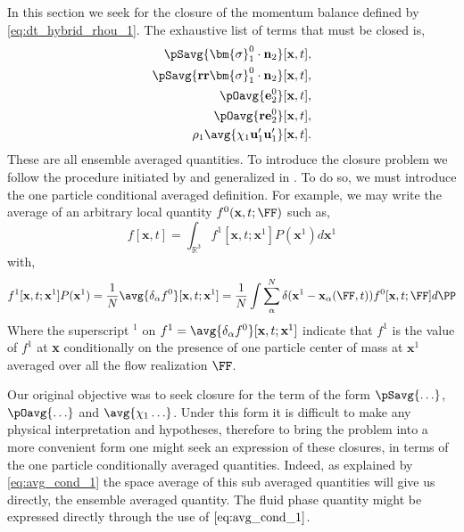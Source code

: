 In this section we seek for the closure of the momentum balance defined by \ref{eq:dt_hybrid_rhou_1}.
The exhaustive list of terms that must be closed is, 
\begin{align}
    \pSavg{\bm{\sigma}_1^0\cdot \textbf{n}_2}[\textbf{x},t],\\
    \pSavg{\textbf{rr}\bm{\sigma}_1^0\cdot \textbf{n}_2}[\textbf{x},t],\\
    \pOavg{\textbf{e}_2^0}[\textbf{x},t],\\
    \pOavg{\textbf{re}_2^0}[\textbf{x},t],\\
    \rho_1 \avg{\chi_1 \textbf{u}_1'\textbf{u}_1'}[\textbf{x},t].
    \label{eq:closures}
\end{align}
These are all ensemble averaged quantities. 
To introduce the closure problem we follow the procedure initiated by \citet{hinch1977averaged} and generalized in \citet[Appendix A]{zhang1994ensemble}. 
To do so, we must introduce the one particle conditional averaged definition. 
For example, we may write the average of an arbitrary local quantity $f^0(\textbf{x},t;\FF)$ such as, 
\begin{equation}
    f[\textbf{x},t]
    = \int_{\mathbb{R}^3}
    f^1[\textbf{x},t;\textbf{x}^1]
    P(\textbf{x}^1) d\textbf{x}^1
    \label{eq:avg_cond_1}
\end{equation}
with, 
\begin{equation*}
    f^1[\textbf{x},t;\textbf{x}^1] P(\textbf{x}^1)
    =
    \frac{1}{N} 
    \avg{\delta_\alpha f^0}[\textbf{x},t;\textbf{x}^1]
    = 
    \frac{1}{N}
    \int 
    \sum_\alpha^N \delta(\textbf{x}^1 - \textbf{x}_\alpha(\FF,t))
    f^0[\textbf{x},t;\FF]
    d\PP
\end{equation*}
Where the superscript $^1$ on $f^1 = \avg{\delta_\alpha f^0}[\textbf{x},t;\textbf{x}^1]$ indicate that $f^1$ is the value of $f^1$ at \textbf{x} conditionally on the presence of one particle center of mass at $\textbf{x}^1$ averaged over all the flow realization $\FF$. 

Our original objective was to seek closure for the term of the form $\pSavg{\ldots}$, $\pOavg{\ldots}$ and $\avg{\chi_1 \ldots}$.
Under this form it is difficult to make any physical interpretation and hypotheses, therefore to bring the problem into a more convenient form one might seek an expression of these closures, in terms of the one particle conditionally averaged quantities.
Indeed, as explained by \ref{eq:avg_cond_1} the space average of this sub averaged quantities will give us directly, the ensemble averaged quantity. 
The fluid phase quantity might be expressed directly through the use of $\ref{eq:avg_cond_1}$. 

